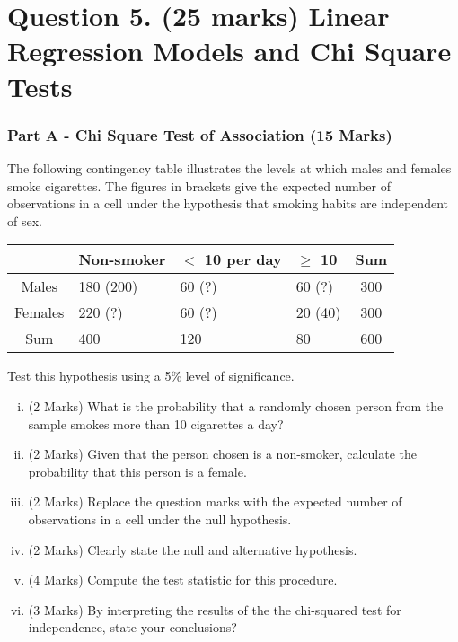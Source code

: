 \documentclass[a4paper,12pt]{article}
\begin{document}
\newpage

\section*{Question 5. (25 marks) Linear Regression Models and Chi Square Tests }

\subsubsection*{Part A - Chi Square Test of Association (15 Marks)}
The following contingency table illustrates the levels at which males and females smoke cigarettes. The figures in brackets give the expected number of observations in a cell under the hypothesis that smoking habits are independent of sex.

{

	\begin{center}
		\begin{tabular}{|c||l|l|l||c|}
			\hline
			& Non-smoker&  $<$ 10 per day &  $\geq $ 10  & \phantom{sp}Sum\phantom{sp} \\ \hline
			
			Males & 180\phantom{spa} (200)&  60\phantom{spa} (?) & 60 \phantom{spa} (?) & 300\\ \hline
			
			Females & 220\phantom{spa} (?) & 60 \phantom{spa}(?)& 20 \phantom{spa} (40) & 300\\ \hline \hline
			
			Sum & 400 & 120 & 80& 600\\ \hline
		\end{tabular} 
	\end{center}
	\phantom{spa}
}
\medskip
Test this hypothesis using a 5\% level of significance. 

\begin{enumerate}[(i)]
\item (2 Marks) What is the probability that a randomly chosen person from the sample smokes more than 10 cigarettes a day? %

\item (2 Marks) Given that the person chosen is a non-smoker, calculate the probability that this person is a female. %

\item (2 Marks) Replace the question marks with the expected number of observations in a cell under the null hypothesis. %
\item (2 Marks) Clearly state the null and alternative hypothesis.
\item (4 Marks) Compute the test statistic for this procedure.
\item (3 Marks) By interpreting the results of the the chi-squared test for independence, state your conclusions? %
\end{enumerate}
\end{document}
